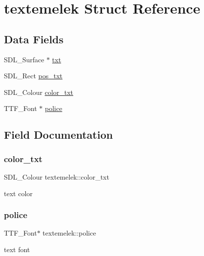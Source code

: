 \hypertarget{structtextemelek}{}\section{textemelek Struct Reference}
\label{structtextemelek}
\subsection*{Data Fields}
\begin{DoxyCompactItemize}
\item 
S\+D\+L\+\_\+\+Surface $\ast$ \hyperlink{structtextemelek_a6f903817cfb262dfe44ace959683da71}{txt}
\item 
S\+D\+L\+\_\+\+Rect \hyperlink{structtextemelek_aa5ad50b248830883221211d1ec9971b9}{pos\+\_\+txt}
\item 
S\+D\+L\+\_\+\+Colour \hyperlink{structtextemelek_a21bf33a2986019676f912d55931d5a51}{color\+\_\+txt}
\item 
T\+T\+F\+\_\+\+Font $\ast$ \hyperlink{structtextemelek_a639914b0eb066fab7d1feca7dbfb24e8}{police}
\end{DoxyCompactItemize}


\subsection{Field Documentation}
\mbox{\label{structtextemelek_a21bf33a2986019676f912d55931d5a51}} 
\subsubsection{\texorpdfstring{color\+\_\+txt}{color\_txt}}
{\footnotesize\ttfamily S\+D\+L\+\_\+\+Colour textemelek\+::color\+\_\+txt}

text color \mbox{\label{structtextemelek_a639914b0eb066fab7d1feca7dbfb24e8}} 
\subsubsection{\texorpdfstring{police}{police}}
{\footnotesize\ttfamily T\+T\+F\+\_\+\+Font$\ast$ textemelek\+::police}

text font \mbox{\label{structtextemelek_aa5ad50b248830883221211d1ec9971b9}} 
